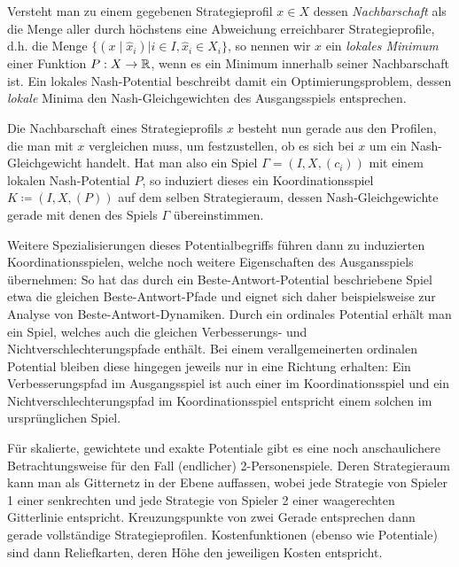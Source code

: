 Versteht man zu einem gegebenen Strategieprofil $x \in X$ dessen \emph{Nachbarschaft} als die Menge aller durch höchstens eine Abweichung erreichbarer Strategieprofile, d.h. die Menge $\{(x \mid \hat{x}_i) | i \in I, \hat{x}_i \in X_i\}$, so nennen wir $x$ ein \emph{lokales Minimum} einer Funktion $P: X \to \mathbb{R}$, wenn es ein Minimum innerhalb seiner Nachbarschaft ist. Ein lokales Nash-Potential beschreibt damit ein Optimierungsproblem, dessen \emph{lokale} Minima den Nash-Gleichgewichten des Ausgangsspiels entsprechen.

Die Nachbarschaft eines Strategieprofils $x$ besteht nun gerade aus den Profilen, die man mit $x$ vergleichen muss, um festzustellen, ob es sich bei $x$ um ein Nash-Gleichgewicht handelt. Hat man also ein Spiel $\Gamma = (I, X, (c_i))$ mit einem lokalen Nash-Potential $P$, so induziert dieses ein Koordinationsspiel $K \coloneqq (I, X, (P))$ auf dem selben Strategieraum, dessen Nash-Gleichgewichte gerade mit denen des Spiels $\Gamma$ übereinstimmen.

Weitere Spezialisierungen dieses Potentialbegriffs führen dann zu induzierten  Koordinationsspielen, welche noch weitere Eigenschaften des Ausgansspiels übernehmen: So hat das durch ein Beste-Antwort-Potential beschriebene Spiel etwa die gleichen Beste-Antwort-Pfade und eignet sich daher beispielsweise zur Analyse von Beste-Antwort-Dynamiken. Durch ein ordinales Potential erhält man ein Spiel, welches auch die gleichen Verbesserungs- und Nichtverschlechterungspfade enthält. Bei einem verallgemeinerten ordinalen Potential bleiben diese hingegen jeweils nur in eine Richtung erhalten: Ein Verbesserungspfad im Ausgangsspiel ist auch einer im Koordinationsspiel und ein Nichtverschlechterungspfad im Koordinationsspiel entspricht einem solchen im ursprünglichen Spiel.

Für skalierte, gewichtete und exakte Potentiale gibt es eine noch anschaulichere Betrachtungsweise für den Fall (endlicher) 2-Personenspiele. Deren Strategieraum kann man als Gitternetz in der Ebene auffassen, wobei jede Strategie von Spieler 1 einer senkrechten und jede Strategie von Spieler 2 einer waagerechten Gitterlinie entspricht. Kreuzungspunkte von zwei Gerade entsprechen dann gerade vollständige Strategieprofilen. Kostenfunktionen (ebenso wie Potentiale) sind dann \glqq Reliefkarten\grqq{}, deren Höhe den jeweiligen Kosten entspricht. 


